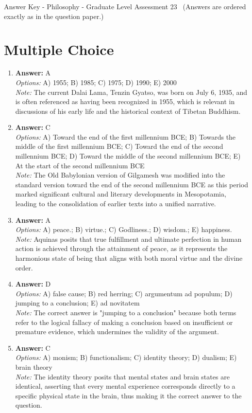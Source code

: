 \documentclass[12pt]{article}
\begin{document}
\begin{center}
Answer Key - Philosophy - Graduate Level Assessment 23 \
\small (Answers are ordered exactly as in the question paper.)
\end{center}

\section*{Multiple Choice}
\begin{enumerate}[label=\arabic*.]
\item \textbf{Answer:} A
\\ \textit{Options:} A) 1955; B) 1985; C) 1975; D) 1990; E) 2000
\\ \textit{Note:} The current Dalai Lama, Tenzin Gyatso, was born on July 6, 1935, and is often referenced as having been recognized in 1955, which is relevant in discussions of his early life and the historical context of Tibetan Buddhism.
\item \textbf{Answer:} C
\\ \textit{Options:} A) Toward the end of the first millennium BCE; B) Towards the middle of the first millennium BCE; C) Toward the end of the second millennium BCE; D) Toward the middle of the second millennium BCE; E) At the start of the second millennium BCE
\\ \textit{Note:} The Old Babylonian version of Gilgamesh was modified into the standard version toward the end of the second millennium BCE as this period marked significant cultural and literary developments in Mesopotamia, leading to the consolidation of earlier texts into a unified narrative.
\item \textbf{Answer:} A
\\ \textit{Options:} A) peace.; B) virtue.; C) Godliness.; D) wisdom.; E) happiness.
\\ \textit{Note:} Aquinas posits that true fulfillment and ultimate perfection in human action is achieved through the attainment of peace, as it represents the harmonious state of being that aligns with both moral virtue and the divine order.
\item \textbf{Answer:} D
\\ \textit{Options:} A) false cause; B) red herring; C) argumentum ad populum; D) jumping to a conclusion; E) ad novitatem
\\ \textit{Note:} The correct answer is "jumping to a conclusion" because both terms refer to the logical fallacy of making a conclusion based on insufficient or premature evidence, which undermines the validity of the argument.
\item \textbf{Answer:} C
\\ \textit{Options:} A) monism; B) functionalism; C) identity theory; D) dualism; E) brain theory
\\ \textit{Note:} The identity theory posits that mental states and brain states are identical, asserting that every mental experience corresponds directly to a specific physical state in the brain, thus making it the correct answer to the question.
\end{enumerate}
\end{document}
